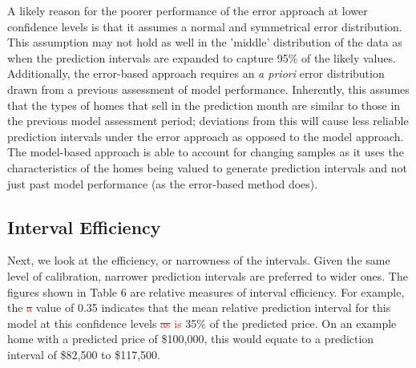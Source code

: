 \documentclass[colTwo]{anon}
\theoremstyle{definition}
\begin{document}
A likely reason for the poorer performance of the error approach at lower confidence levels is that it assumes a normal and symmetrical error distribution. This assumption may not hold as well in the 'middle' distribution of the data as when the prediction intervals are expanded to capture 95\% of the likely values. Additionally, the error-based approach requires an \textit{a priori} error distribution drawn from a previous assessment of model performance.  Inherently, this assumes that the types of homes that sell in the prediction month are similar to those in the previous model assessment period; deviations from this will cause less reliable prediction intervals under the error approach as opposed to the model approach.  The model-based approach is able to account for changing samples as it uses the characteristics of the homes being valued to generate prediction intervals and not just past model performance (as the error-based method does). 
\subsection{Interval Efficiency}

Next, we look at the efficiency, or narrowness of the intervals.  Given the same level of calibration, narrower prediction intervals are preferred to wider ones. The figures shown in Table 6 are relative measures of interval efficiency.  For example, the \textcolor{red}{\st{a}} value of 0.35 indicates that the mean relative prediction interval for this model at this confidence levels \textcolor{red}{\st{as} is} 35\% of the predicted price. On an example home with a predicted price of \$100,000, this would equate to a prediction interval of \$82,500 to \$117,500.
\end{document}
